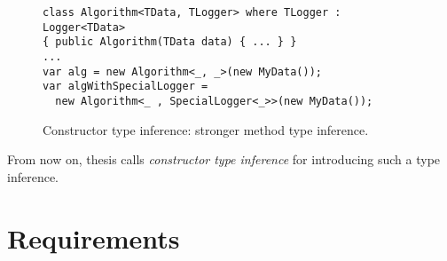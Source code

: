 \begin{figure}[h]
\begin{lstlisting}[style=csharp]
class Algorithm<TData, TLogger> where TLogger : Logger<TData> 
{ public Algorithm(TData data) { ... } }
...
var alg = new Algorithm<_, _>(new MyData());
var algWithSpecialLogger = 
  new Algorithm<_ , SpecialLogger<_>>(new MyData());
\end{lstlisting}
\caption{Constructor type inference: stronger method type inference.}
\label{img38:sol2}
\end{figure}
\par
From now on, thesis calls \textit{constructor type inference} for introducing such a type inference.

\section{Requirements}

